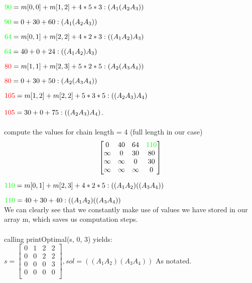 $\textcolor{green}{90} = m[0,0] + m[1,2] + 4*5*3 : (A_1(A_{2}A_{3}))$

$\textcolor{green}{90} = 0 + 30  + 60 : (A_1(A_{2}A_{3}))$

$\textcolor{green}{64} = m[0,1] + m[2,2] + 4*2*3 : ((A_{1}A_{2})A_{3})$

$\textcolor{green}{64} = 40 + 0 + 24 : ((A_{1}A_{2})A_{3})$

$\textcolor{red}{80} = m[1, 1] + m[2,3] + 5*2*5 : (A_2(A_{3}A_{4}))$

$\textcolor{red}{80} = 0 + 30 + 50 : (A_2(A_{3}A_{4}))$

$\textcolor{red}{105} = m[1, 2] + m[2,2] + 5*3*5 : ((A_{2}A_{3})A_{4})$

$\textcolor{red}{105} = 30 + 0 + 75 : ((A_{2}A_{3})A_{4})$.
\\
\\
compute the values for chain length = 4 (full length in our case)
\[
  \begin{bmatrix}
    0 & 40 & 64 & \textcolor{green}{110} \\
    \infty & 0 & 30  & 80 \\
    \infty & \infty & 0 & 30 \\
    \infty & \infty & \infty & 0 \\
  \end{bmatrix}
\]

$\textcolor{green}{110} =  m[0,1] + m[2,3] + 4*2*5 : ((A_{1}A_{2})((A_{3}A_{4})) $

$\textcolor{green}{110} =  40 + 30 +  40 : ((A_{1}A_{2})((A_{3}A_{4})) $
\\
We can clearly see that we constantly make use of values we have stored in our array m, which saves us computation steps.
\\
\\
calling printOptimal(s, 0, 3) yields:
\space{0.3em}
$ s = \begin{bmatrix}
    0 & 1 & 2 & 2 \\
    0 & 0 & 2  & 2 \\
    0 & 0 & 0 & 3 \\
    0 & 0 & 0 & 0 \\
  \end{bmatrix},
  sol = ((A_{1}A_{2})(A_{3}A_{4}))$
\vspace{0.3em}
As notated.